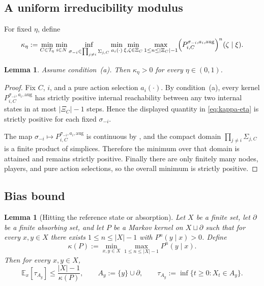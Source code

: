 \documentclass[12pt]{article}
\newtheorem{lemma}[theorem]{Lemma}
\theoremstyle{definition}
\newcommand{\E}{\mathbb{E}}
\newcommand{\1}{\mathbf{1}}
\newcommand{\cT}{\mathcal{T}}
\begin{document}
\subsection{A uniform irreducibility modulus}

For fixed $\eta$, define
\begin{equation}
\label{eq:kappa-eta}
\kappa_\eta
:=
\min_{C\in\cT_\eta}
\min_{i\in N}
\inf_{\sigma_{-i}\in\prod_{j\ne i}\Sigma_{j,C}}
\min_{a_i(\cdot)}
\min_{\xi,\zeta\in\Xi_C}
\max_{1\le n\le |\Xi_C|-1}
\Bigl(P_{i,C}^{\sigma_{-i},a_i,\mathrm{aug}}\Bigr)^n(\zeta\mid\xi).
\end{equation}

\begin{lemma}
\label{lem:kappa-positive}
Assume condition~\textnormal{(a)}. Then $\kappa_\eta>0$ for every $\eta\in(0,1)$.
\end{lemma}

\begin{proof}
Fix $C$, $i$, and a pure action selection $a_i(\cdot)$. By
condition~\textnormal{(a)}, every kernel
$P_{i,C}^{\sigma_{-i},a_i,\mathrm{aug}}$ has strictly positive internal
reachability between any two internal states in at most $|\Xi_C|-1$ steps. Hence
the displayed quantity in \eqref{eq:kappa-eta} is strictly positive for each fixed
$\sigma_{-i}$.

The map
$\sigma_{-i}\mapsto P_{i,C}^{\sigma_{-i},a_i,\mathrm{aug}}$ is continuous by
, and the compact domain
$\prod_{j\ne i}\Sigma_{j,C}$ is a finite product of simplices. Therefore the
minimum over that domain is attained and remains strictly positive. Finally there
are only finitely many nodes, players, and pure action selections, so the overall
minimum is strictly positive.
\end{proof}

\subsection{Bias bound}


\begin{lemma}[Hitting the reference state or absorption]
\label{lem:hitting-time}
Let $X$ be a finite set, let $\partial$ be a finite absorbing set, and let $P$ be a
Markov kernel on $X\sqcup\partial$ such that for every $x,y\in X$ there exists
$1\le n\le |X|-1$ with $P^n(y\mid x)>0$. Define
\[
\kappa(P):=\min_{x,y\in X}\max_{1\le n\le |X|-1}P^n(y\mid x).
\]
Then for every $x,y\in X$,
\[
\E_x[\tau_{A_y}]\le \frac{|X|-1}{\kappa(P)},
\qquad
A_y:=\{y\}\cup \partial,
\qquad
\tau_{A_y}:=\inf\{t\ge 0:X_t\in A_y\}.
\]
\end{lemma}
\end{document}
